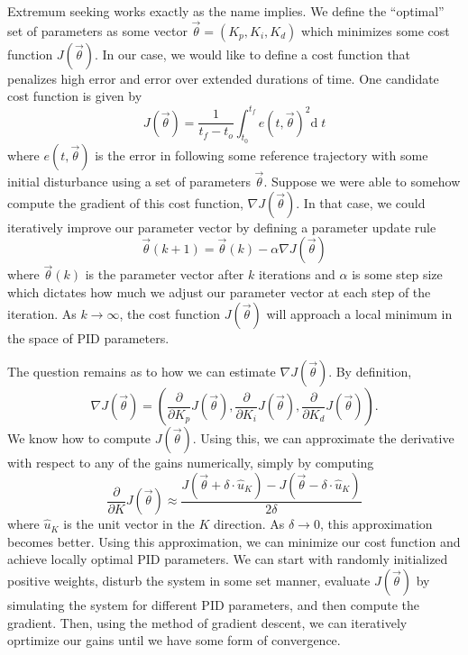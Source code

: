 \documentclass{article}
\newcommand\dd{\text{d}\;}
\newcommand\p[2]{\frac{\partial #1}{\partial #2}}
\newcommand\inv[1]{\frac{1}{#1}}
\begin{document}
Extremum seeking works exactly as the name implies. We define the ``optimal'' set of parameters as
some vector $\vec \theta = (K_p, K_i, K_d)$ which minimizes some cost function $J(\vec\theta)$. In our case, we would
like to define a cost function that penalizes high error and error over extended durations of time.
One candidate cost function is given by
\[J(\vec\theta) = \inv{t_f - t_o} \int_{t_0}^{t_f} e(t, \vec\theta)^2 \dd t\]
where $e(t, \vec\theta)$ is the error in following some reference trajectory with some initial
disturbance using a set of parameters $\vec\theta$. Suppose we were able to somehow compute the
gradient of this cost function, $\nabla J(\vec\theta)$. In that case, we could iteratively improve
our parameter vector by defining a parameter update rule
\[\vec\theta(k + 1) = \vec\theta(k) - \alpha \nabla J(\vec \theta)\]
where $\vec\theta(k)$ is the parameter vector after $k$ iterations and $\alpha$ is some step size
which dictates how much we adjust our parameter vector at each step of the iteration. As
$k\to\infty$, the cost function $J(\vec\theta)$ will approach a local minimum in the space of PID
parameters. 

The question remains as to how we can estimate $\nabla J(\vec\theta)$. By definition,
\[\nabla J(\vec\theta) = \left(\p{ }{K_p} J(\vec\theta), \p{ }{K_i} J(\vec\theta), \p{ }{K_d}
    J(\vec\theta)\right).\]
We  know how to compute $J(\vec\theta)$. Using this, we can approximate the derivative with respect
to any of the gains numerically, simply by computing
\[\p{ }{K} J(\vec\theta) \approx \frac{J(\vec\theta + \delta\cdot \hat{u}_K) - J(\vec\theta-
    \delta\cdot \hat{u}_K)}{2\delta}\] 
where $\hat{u}_K$ is the unit vector in the $K$ direction. As $\delta\to 0$, this approximation
becomes better. Using this approximation, we can minimize our cost function and achieve locally
optimal PID parameters. We can start with randomly initialized positive weights, disturb the system
in some set manner, evaluate $J(\vec\theta)$ by simulating the system for different PID parameters,
and then compute the gradient. Then, using the method of gradient descent, we can iteratively
oprtimize our gains until we have some form of convergence.
\end{document}

